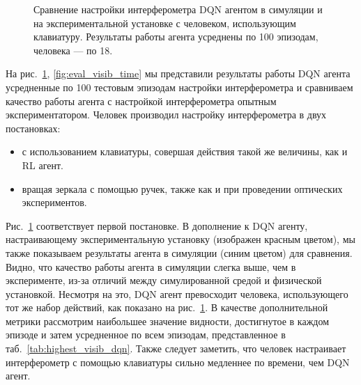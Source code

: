 \begin{figure}[ht]
\caption{Сравнение настройки интерферометра DQN агентом в симуляции и на экспериментальной установке с человеком, использующим клавиатуру. Результаты работы агента усреднены по 100 эпизодам, человека --- по 18.}
\label{fig:eval_visib_step}
\end{figure}

На рис.~\ref{fig:eval_visib_step}, \ref{fig:eval_visib_time} мы представили результаты работы DQN агента усредненные по 100 тестовым эпизодам настройки интерферометра и сравниваем качество работы агента с настройкой интерферометра опытным экспериментатором. Человек производил настройку интерферометра в двух постановках:  

\begin{itemize}
    \item с использованием клавиатуры, совершая действия такой же величины, как и RL агент. 
    \item вращая зеркала с помощью ручек, также как и при проведении оптических экспериментов.
\end{itemize}

Рис.~\ref{fig:eval_visib_step} соответствует первой постановке. В дополнение к DQN агенту, настраивающему экспериментальную установку (изображен красным цветом), мы также показываем результаты агента в симуляции (синим цветом) для сравнения. Видно, что качество работы агента в симуляции слегка выше, чем в эксперименте, из-за отличий между симулированной средой и физической установкой. Несмотря на это, DQN агент превосходит человека, использующего тот же набор действий, как показано на рис.~\ref{fig:eval_visib_step}. В качестве дополнительной метрики рассмотрим наибольшее значение видности, достигнутое в каждом эпизоде и затем усредненное по всем эпизодам, представленное в таб.~\ref{tab:highest_visib_dqn}. Также следует заметить, что человек настраивает интерферометр с помощью клавиатуры сильно медленнее по времени, чем DQN агент. 

